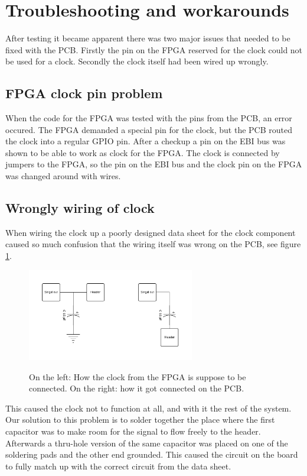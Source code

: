 \documentclass[../main/report.tex]{subfiles}
\begin{document}
\section{Troubleshooting and workarounds}

After testing it became apparent there was two major issues that needed to be fixed with the PCB.
Firstly the pin on the FPGA reserved for the clock could not be used for a clock.
Secondly the clock itself had been wired up wrongly.

\subsection*{FPGA clock pin problem}
When the code for the FPGA was tested with the pins from the PCB, an error occured.
The FPGA demanded a special pin for the clock, but the PCB routed the clock into a regular GPIO pin.
After a checkup a pin on the EBI bus was shown to be able to work as clock for the FPGA.
The clock is connected by jumpers to the FPGA, so the pin on the EBI bus and the clock pin on the FPGA was changed around with wires.

\subsection*{Wrongly wiring of clock}

When wiring the clock up a poorly designed data sheet for the clock component caused so much confusion that the wiring itself was wrong on the PCB, see figure \ref{fig:pcb-clock}.

\begin{figure}[H]
    \centering
    \includegraphics[width=0.65\textwidth]{../pcb/assets/pcb-clock.pdf}
    \label{fig:pcb-clock}
    \caption{On the left: How the clock from the FPGA is suppose to be connected.
             On the right: how it got connected on the PCB.}
\end{figure}

This caused the clock not to function at all, and with it the rest of the system.
Our solution to this problem is to solder together the place where the first capacitor was to make room for the signal to flow freely to the header.
Afterwards a thru-hole version of the same capacitor was placed on one of the soldering pads and the other end grounded.
This caused the circuit on the board to fully match up with the correct circuit from the data sheet.
\end{document}
